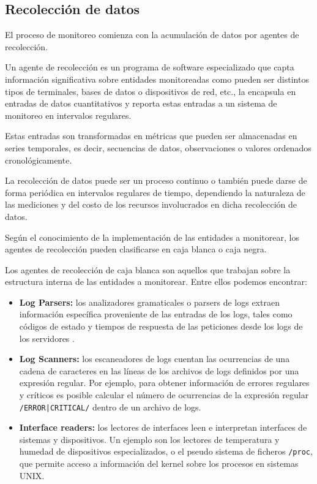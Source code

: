 \subsection{Recolección de datos}
\label{recoleccion-de-datos}

El proceso de monitoreo comienza con la acumulación de datos por agentes de
recolección.

Un agente de recolección es un programa de software especializado que capta
información significativa sobre entidades monitoreadas como pueden ser
distintos tipos de terminales, bases de datos o dispositivos de red, etc., la
encapsula en entradas de datos cuantitativos y reporta estas entradas a un
sistema de monitoreo en intervalos regulares.

Estas entradas son transformadas en métricas que pueden ser almacenadas en
series temporales, es decir, secuencias de datos, observaciones o valores
ordenados cronológicamente.

La recolección de datos puede ser un proceso continuo o también puede darse de
forma periódica en intervalos regulares de tiempo, dependiendo la naturaleza de
las mediciones y del costo de los recursos involucrados en dicha recolección de
datos.

Según el conocimiento de la implementación de las entidades a monitorear, los
agentes de recolección pueden clasificarse en caja blanca o caja negra.

Los agentes de recolección de caja blanca son aquellos que trabajan sobre la
estructura interna de las entidades a monitorear. Entre ellos podemos
encontrar:

\begin{itemize}
  \item \textbf{Log Parsers:} los analizadores gramaticales o parsers de logs
    extraen información específica proveniente de las entradas de los logs,
    tales como códigos de estado y tiempos de respuesta de las peticiones desde
    los logs de los servidores .

  \item \textbf{Log Scanners:} los escaneadores de logs cuentan las ocurrencias
    de una cadena de caracteres en las líneas de los archivos de logs definidos
    por una expresión regular. Por ejemplo, para obtener información de errores
    regulares y críticos es posible calcular el número de ocurrencias de la
    expresión regular \texttt{/ERROR|CRITICAL/} dentro de un archivo de logs.

  \item \textbf{Interface readers:} los lectores de interfaces leen e
    interpretan interfaces de sistemas y dispositivos. Un ejemplo son los
    lectores de temperatura y humedad de dispositivos especializados, o el
    pseudo sistema de ficheros \texttt{/proc}, que permite acceso a información del
    kernel sobre los procesos en sistemas UNIX.
\end{itemize}

